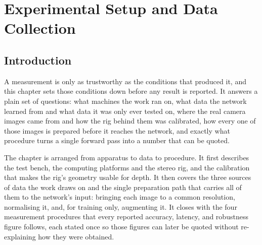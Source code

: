 \chapter{Experimental Setup and Data Collection}
\label{ch:experimental}

\section{Introduction}
A measurement is only as trustworthy as the conditions that produced it,
and this chapter sets those conditions down before any result is
reported. It answers a plain set of questions: what machines the work
ran on, what data the network learned from and what data it was only
ever tested on, where the real camera images came from and how the rig
behind them was calibrated, how every one of those images is prepared
before it reaches the network, and exactly what procedure turns a single
forward pass into a number that can be quoted.

The chapter is arranged from apparatus to data to procedure. It first
describes the test bench, the computing platforms and the stereo rig,
and the calibration that makes the rig's geometry usable for depth. It
then covers the three sources of data the work draws on and the single
preparation path that carries all of them to the network's input:
bringing each image to a common resolution, normalising it, and, for
training only, augmenting it. It closes with the four measurement
procedures that every reported accuracy, latency, and robustness figure
follows, each stated once so those figures can later be quoted without
re-explaining how they were obtained.

